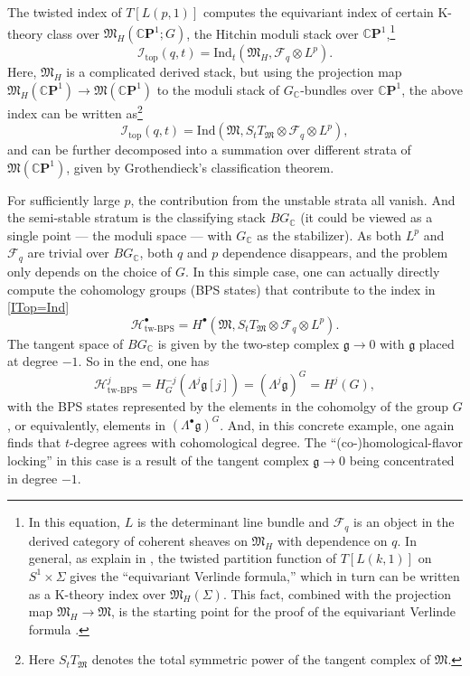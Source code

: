 \documentclass[hyper,letterpaper]{JHEP3}
\newcommand{\be}{\begin{equation}}
\newcommand{\ee}{\end{equation}}
\newcommand{\C}{{\mathbb C}}
\newcommand{\cp}{{\mathbb{C}}{\mathbf{P}}}
\def\frak{\mathfrak}
\def\CF{{\mathcal F}}
\def\CH{{\mathcal H}}
\def\CI{{\mathcal I}}
\begin{document}
The twisted index of $T[L(p,1)]$ computes the equivariant index of certain K-theory class over $\frak{M}_H(\cp^1;G)$, the Hitchin moduli stack over $\cp^1$,\footnote{In this equation, $L$ is the determinant line bundle and $\CF_q$ is an object in the derived category of coherent sheaves on $\frak{M}_H$ with dependence on $q$. In general, as explain in \cite{equivariant, EVFCBI}, the twisted partition function of $T[L(k,1)]$ on $S^1\times \Sigma$ gives the ``equivariant Verlinde formula,'' which in turn can be written as a K-theory index over $\frak{M}_H(\Sigma)$. This fact, combined with the projection map $\frak{M}_H\rightarrow \frak{M}$, is the starting point for the proof of the equivariant Verlinde formula \cite{Andersen:2016hoj, 2016arXiv160801754H}.}
\be
\CI_{\text{top}}(q,t)=\mathrm{Ind}_t(\frak{M}_H,\CF_q\otimes L^p).
\ee
Here, $\frak{M}_H$ is a complicated derived stack, but using the projection map $\frak{M}_H(\cp^1)\rightarrow \frak{M}(\cp^1)$ to the moduli stack of $G_\C$-bundles over $\cp^1$, the above index can be written as\footnote{Here $S_tT_{\frak{M}}$ denotes the total symmetric power of the tangent complex of $\frak{M}$. }
\be\label{ITop=Ind}
\CI_{\text{top}}(q,t)=\mathrm{Ind}(\frak{M},S_tT_{\frak{M}}\otimes\CF_q\otimes L^p),
\ee
and can be further decomposed into a summation over different strata of $\frak{M}(\cp^1)$, given by Grothendieck's classification theorem.

For sufficiently large $p$, the contribution from the unstable strata all vanish. And the semi-stable stratum is the classifying stack $BG_\C$ (it could be viewed as a single point --- the moduli space --- with $G_\C$ as the stabilizer). As both $L^p$ and $\CF_q$ are trivial over $BG_\C$, both $q$ and $p$ dependence disappears, and the problem only depends on the choice of $G$. In this simple case, one can actually directly compute the cohomology groups (BPS states) that contribute to the index in \eqref{ITop=Ind}
\be
\CH_{\text{tw-BPS}}^\bullet=H^\bullet(\frak{M},S_tT_{\frak{M}}\otimes\CF_q\otimes L^p).
\ee
The tangent space of $BG_\C$ is given by the two-step complex $\frak{g}\rightarrow 0$ with $\frak{g}$ placed at degree $-1$. So in the end, one has
\be
\CH_{\text{tw-BPS}}^j=H^{-j}_{G}(\Lambda^{j}\frak{g}[j])=(\Lambda^{j}\frak{g})^G=H^{j}(G),
\ee
with the BPS states represented by the elements in the cohomolgy of the group $G$, or equivalently, elements in $(\Lambda^\bullet\frak{g})^{G}$. And, in this concrete example, one again finds that $t$-degree agrees with cohomological degree. The ``(co-)homological-flavor locking'' in this case is a result of the tangent complex $\frak{g}\rightarrow 0$ being concentrated in degree $-1$.
\end{document}
